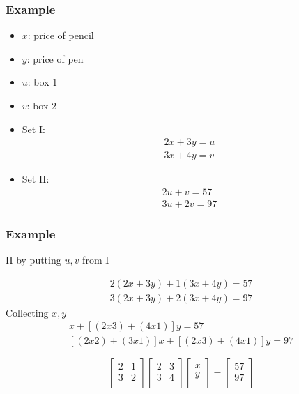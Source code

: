   \begin{frame}[fragile]\frametitle{Example}
\begin{itemize}
\item $x$: price of pencil
\item $y$: price of pen
\item $u$: box 1
\item $v$: box 2
\item Set I: \begin{align} 2x + 3y = u \\ 3x+4y = v\end{align}
\item Set II: \begin{align} 2u + v = 57 \\ 3u+2v = 97\end{align}
\end{itemize}
\end{frame}

  \begin{frame}[fragile]\frametitle{Example}
II by putting $u,v$ from I

\begin{align} 2(2x + 3y) + 1(3x+4y) = 57 \\  3(2x + 3y) + 2(3x+4y) = 97\end{align}
Collecting $x,y$
\begin{align} [(2x2) + (3x1)]x + [(2x3) + (4x1)]y = 57 \\   [(2x2) + (3x1)]x + [(2x3) + (4x1)]y = 97\end{align}

$$
\left[
\begin{array}{cc}
2 & 1 \\
3 & 2 \\
\end{array}
\right]
\left[
\begin{array}{cc}
2 & 3 \\
3 & 4 \\
\end{array}
\right]\left[
\begin{array}{c}
x \\
y\\
\end{array}\right] =\left[
\begin{array}{c}
57 \\
97\\
\end{array} 
\right]
$$
\end{frame}


